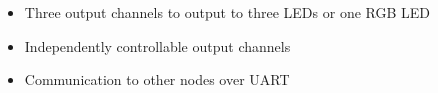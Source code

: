 \begin{itemize}
    \item Three output channels to output to three LEDs or one RGB LED
    \item Independently controllable output channels
    \item Communication to other nodes over UART
\end{itemize}

